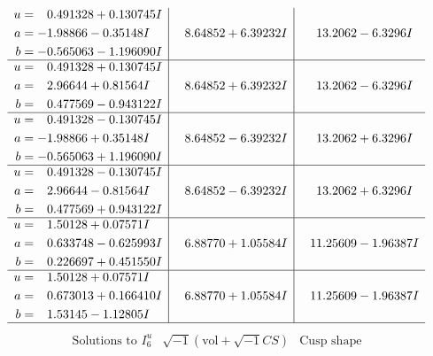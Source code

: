\documentclass[1p]{elsarticle_modified}
\theoremstyle{definition}
\newcommand{\I}{\sqrt{-1}}
\begin{document}
$$\begin{array}{c|c|c}
\begin{aligned}
u &= \phantom{-}0.491328 + 0.130745 I \\
a &= -1.98866 - 0.35148 I \\
b &= -0.565063 - 1.196090 I\end{aligned}
 & \phantom{-}8.64852 + 6.39232 I & \phantom{-}13.2062 - 6.3296 I \\ \hline\begin{aligned}
u &= \phantom{-}0.491328 + 0.130745 I \\
a &= \phantom{-}2.96644 + 0.81564 I \\
b &= \phantom{-}0.477569 - 0.943122 I\end{aligned}
 & \phantom{-}8.64852 + 6.39232 I & \phantom{-}13.2062 - 6.3296 I \\ \hline\begin{aligned}
u &= \phantom{-}0.491328 - 0.130745 I \\
a &= -1.98866 + 0.35148 I \\
b &= -0.565063 + 1.196090 I\end{aligned}
 & \phantom{-}8.64852 - 6.39232 I & \phantom{-}13.2062 + 6.3296 I \\ \hline\begin{aligned}
u &= \phantom{-}0.491328 - 0.130745 I \\
a &= \phantom{-}2.96644 - 0.81564 I \\
b &= \phantom{-}0.477569 + 0.943122 I\end{aligned}
 & \phantom{-}8.64852 - 6.39232 I & \phantom{-}13.2062 + 6.3296 I \\ \hline\begin{aligned}
u &= \phantom{-}1.50128 + 0.07571 I \\
a &= \phantom{-}0.633748 - 0.625993 I \\
b &= \phantom{-}0.226697 + 0.451550 I\end{aligned}
 & \phantom{-}6.88770 + 1.05584 I & \phantom{-}11.25609 - 1.96387 I \\ \hline\begin{aligned}
u &= \phantom{-}1.50128 + 0.07571 I \\
a &= \phantom{-}0.673013 + 0.166410 I \\
b &= \phantom{-}1.53145 - 1.12805 I\end{aligned}
 & \phantom{-}6.88770 + 1.05584 I & \phantom{-}11.25609 - 1.96387 I\\
 \hline 
 \end{array}$$\newpage$$\begin{array}{c|c|c}  
\text{Solutions to }I^u_{6}& \I (\text{vol} + \sqrt{-1}CS) & \text{Cusp shape}\\

\end{array}$$
\end{document}
